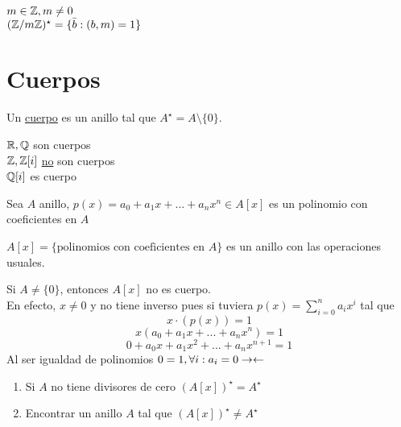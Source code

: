     \begin{eje}
        $m\in\mathbb{Z},m\neq 0$\\
        $(\mathbb{Z}/m\mathbb{Z})^\star=\{\bar{b}:(b,m)=1\}$
    \end{eje}

    \chapter{Cuerpos}
    \begin{defn}[Cuerpo]
        Un \underline{cuerpo} es un anillo tal que $A^\star=A\setminus\{0\}$.
    \end{defn}

    \begin{ejm}
        $\mathbb{R},\mathbb{Q}$ son cuerpos\\
        $\mathbb{Z},\mathbb{Z}[i]$ \underline{no} son cuerpos\\
        $\mathbb{Q}[i]$ es cuerpo
    \end{ejm}

    \begin{defn}
        Sea $A$ anillo, $p(x)=a_0+a_1x+...+a_nx^n\in A[x]$ es un polinomio con coeficientes en $A$
    \end{defn}

    \begin{prop}
        $A[x]=\{\text{polinomios con coeficientes en }A\}$ es un anillo con las operaciones usuales.
    \end{prop}

    \begin{obs}
        Si $A\neq\{0\}$, entonces $A[x]$ no es cuerpo.\\
        En efecto, $x\neq 0$ y no tiene inverso pues si tuviera $p(x)=\sum^n_{i=0}a_ix^i$ tal que
        \[x\cdot(p(x))=1\]
        \[x(a_0+a_1x+...+a_nx^n)=1\]
        \[0+a_0x+a_1x^2+...+a_nx^{n+1}=1\]
        Al ser igualdad de polinomios $0=1,\forall i:a_i=0\rightarrow\leftarrow$
    \end{obs}

    \begin{eje}
        \begin{enumerate}
            \item Si $A$ no tiene divisores de cero $(A[x])^\star=A^\star$

            \item Encontrar un anillo $A$ tal que $(A[x])^\star\neq A^\star$
        \end{enumerate}
    \end{eje}

